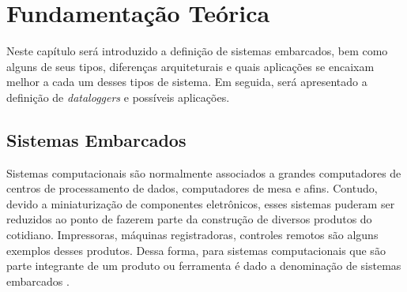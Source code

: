 \chapter{Fundamentação Teórica}
\label{cap:fundamentacao-teorica}



Neste capítulo será introduzido a definição de sistemas embarcados, bem como alguns de seus tipos, diferenças arquiteturais e quais aplicações se encaixam melhor a cada um desses tipos de sistema. Em seguida, será apresentado a definição de \textit{dataloggers} e possíveis aplicações.





\section{Sistemas Embarcados}\label{sec:definicao_sistemas_embarcados}



Sistemas computacionais são normalmente associados a grandes computadores de centros de processamento de dados, computadores de mesa e afins. Contudo, devido a miniaturização de componentes eletrônicos, esses sistemas puderam ser reduzidos ao ponto de fazerem parte da construção de diversos produtos do cotidiano. Impressoras, máquinas registradoras, controles remotos são alguns exemplos desses produtos. Dessa forma, para sistemas computacionais que são parte integrante de um produto ou ferramenta é dado a denominação de sistemas embarcados \cite{vahid2001embedded}.


